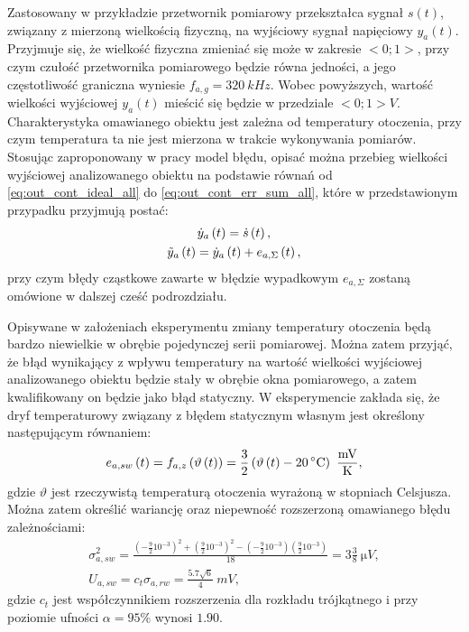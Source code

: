Zastosowany w przykładzie przetwornik pomiarowy przekształca sygnał $s(t)$, związany z mierzoną wielkością fizyczną, na wyjściowy sygnał napięciowy $y_{a}(t)$. Przyjmuje się, że wielkość fizyczna zmieniać się może w zakresie $<0;1>$, przy czym czułość przetwornika pomiarowego będzie równa jedności, a jego częstotliwość graniczna wyniesie $f_{a,g} = \qty{320}{kHz}$. Wobec powyższych, wartość wielkości wyjściowej $y_{a}(t)$ mieścić się będzie w przedziale $<0;1>\unit{V}$. Charakterystyka omawianego obiektu jest zależna od temperatury otoczenia, przy czym temperatura ta nie jest mierzona w trakcie wykonywania pomiarów. Stosując zaproponowany w pracy model błędu, opisać można przebieg wielkości wyjściowej analizowanego obiektu na podstawie równań od \eqref{eq:out_cont_ideal_all} do \eqref{eq:out_cont_err_sum_all}, które w przedstawionym przypadku przyjmują postać:
\begin{gather}
\dot{y}_{a} \left(t\right) = \dot{s} \left(t\right) \label{eq:sym_parta_out_ideal}, \\
\tilde{y}_{a} \left(t\right) = \dot{y}_{a} \left(t\right) + e_{a,\Sigma} \left(t\right) \label{eq:sym_parta_out_real},
\end{gather}
przy czym błędy cząstkowe zawarte w błędzie wypadkowym $e_{a,\Sigma}$ zostaną omówione w dalszej cześć podrozdziału.

Opisywane w założeniach eksperymentu zmiany temperatury otoczenia będą bardzo niewielkie w obrębie pojedynczej serii pomiarowej. Można zatem przyjąć, że błąd wynikający z wpływu temperatury na wartość wielkości wyjściowej analizowanego obiektu będzie stały w obrębie okna pomiarowego, a zatem kwalifikowany on będzie jako błąd statyczny. W eksperymencie zakłada się, że dryf temperaturowy związany z błędem statycznym własnym jest określony następującym równaniem:
\begin{equation}
e_{a,sw} \emb{t} = f_{a,z} \left( \vartheta \emb{t} \right) = \frac{3}{2} \left( \vartheta \emb{t} - \qty{20}{\degreeCelsius} \right) ~\unit{\frac{mV}{K}} \label{eq:sym_parta_stat_err},
\end{equation}
gdzie $\vartheta$ jest rzeczywistą temperaturą otoczenia wyrażoną w stopniach Celsjusza. Można zatem określić wariancję oraz niepewność rozszerzoną omawianego błędu zależnościami:
\begin{gather}
\sigma_{a,sw}^{2} = \frac{\left( -\frac{9}{2} 10^{-3} \right)^{2} + \left( \frac{9}{2} 10^{-3} \right)^{2} - \left( -\frac{9}{2} 10^{-3} \right) \left( \frac{9}{2} 10^{-3} \right)}{18} = 3 \frac{3}{8} ~\unit{\micro V} \label{eq:sym_parta_stat_var}, \\
U_{a,sw} = c_{t} \sigma_{a,rw} = \frac{5.7 \sqrt{6}}{4} ~\unit{mV} \label{eq:sym_parta_stat_unc},
\end{gather}
gdzie $c_{t}$ jest współczynnikiem rozszerzenia dla rozkładu trójkątnego i przy poziomie ufności $\alpha = 95\%$ wynosi $1.90$.


